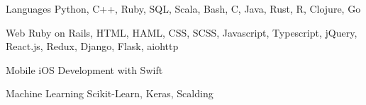 


\begin{cvskills}


  \cvskill
  {Languages}
  {Python, C++, Ruby, SQL, Scala, Bash, C, Java, Rust, R, Clojure, Go}


  \cvskill
  {Web}
  {Ruby on Rails, HTML, HAML, CSS, SCSS, Javascript, Typescript, jQuery, React.js, Redux, Django, Flask, aiohttp}


  \cvskill
  {Mobile}
  {iOS Development with Swift}


  \cvskill
  {Machine Learning}
  {Scikit-Learn, Keras, Scalding}

\end{cvskills}
